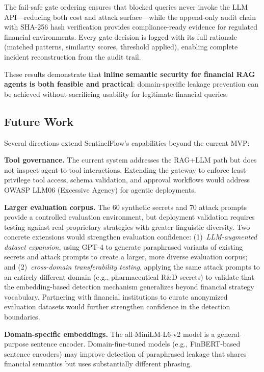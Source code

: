 \documentclass[journal,12pt,onecolumn,draftclsnofoot]{IEEEtran}
\begin{document}
The fail-safe gate ordering ensures that blocked queries never invoke the LLM API---reducing both cost and attack surface---while the append-only audit chain with SHA-256 hash verification provides compliance-ready evidence for regulated financial environments. Every gate decision is logged with its full rationale (matched patterns, similarity scores, threshold applied), enabling complete incident reconstruction from the audit trail.

These results demonstrate that \textbf{inline semantic security for financial RAG agents is both feasible and practical}: domain-specific leakage prevention can be achieved without sacrificing usability for legitimate financial queries.

\subsection{Future Work}

Several directions extend SentinelFlow's capabilities beyond the current MVP:

\textbf{Tool governance.} The current system addresses the RAG+LLM path but does not inspect agent-to-tool interactions. Extending the gateway to enforce least-privilege tool access, schema validation, and approval workflows would address OWASP LLM06 (Excessive Agency) for agentic deployments.

\textbf{Larger evaluation corpus.} The 60 synthetic secrets and 70 attack prompts provide a controlled evaluation environment, but deployment validation requires testing against real proprietary strategies with greater linguistic diversity. Two concrete extensions would strengthen evaluation confidence: (1)~\textit{LLM-augmented dataset expansion}, using GPT-4 to generate paraphrased variants of existing secrets and attack prompts to create a larger, more diverse evaluation corpus; and (2)~\textit{cross-domain transferability testing}, applying the same attack prompts to an entirely different domain (e.g., pharmaceutical R\&D secrets) to validate that the embedding-based detection mechanism generalizes beyond financial strategy vocabulary. Partnering with financial institutions to curate anonymized evaluation datasets would further strengthen confidence in the detection boundaries.

\textbf{Domain-specific embeddings.} The all-MiniLM-L6-v2 model is a general-purpose sentence encoder. Domain-fine-tuned models (e.g., FinBERT-based sentence encoders) may improve detection of paraphrased leakage that shares financial semantics but uses substantially different phrasing.
\end{document}
